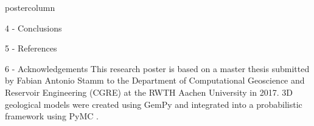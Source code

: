 \documentclass{beamer}
\begin{document}
\begin{frame}
\begin{columns}
\begin{column}{.249\textwidth}
\begin{beamercolorbox}[center]{postercolumn}
\begin{minipage}{.98\textwidth}
{\begin{myblock}{4 - Conclusions}
	


\end{myblock}			
								
					
\begin{myblock}{5 - References}
	\footnotesize
	
\end{myblock}

\begin{myblock}{6 - Acknowledgements}
This research poster is based on a master thesis submitted by Fabian Antonio Stamm to the Department of Computational Geoscience and Reservoir Engineering (CGRE) at the RWTH Aachen University in 2017. 3D geological models were created using GemPy \citep{gmd-2018-61} and integrated into a probabilistic framework using PyMC \citep{salvatier2016pymc3}.
		

			
		

\end{myblock}}
\end{minipage}
\end{beamercolorbox}
\end{column}
\end{columns}
\end{frame}
\end{document}
